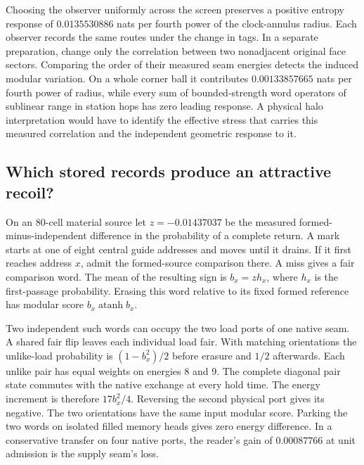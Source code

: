 \documentclass[11pt]{article}
\begin{document}
Choosing the observer uniformly across the screen preserves a positive
entropy response of $0.0135530886$ nats per fourth power of the
clock-annulus radius. Each observer records the same routes under
the change in tags. In a separate preparation, change only the
correlation between two nonadjacent original face sectors. Comparing
the order of their measured seam energies detects the induced modular
variation. On a whole corner ball it contributes $0.00133857665$ nats
per fourth power of radius, while every sum of bounded-strength word
operators of sublinear range in station hops has zero leading response.
A physical halo interpretation would have to identify the effective
stress that carries this measured correlation and the independent
geometric response to it.

\subsection{Which stored records produce an attractive recoil?}

On an 80-cell material source let $z=-0.01437037$ be the measured
formed-minus-independent difference in the probability of a complete
return. A mark starts at one of eight central guide addresses and moves
until it drains. If it first reaches address $x$, admit the formed-source
comparison there. A miss gives a fair comparison word. The mean of the
resulting sign is $b_x=z h_x$, where $h_x$ is the first-passage
probability. Erasing this word relative to its fixed formed reference
has modular score $b_x\operatorname{atanh} b_x$.

Two independent such words can occupy the two load ports of one
native seam. A shared fair flip leaves each individual load fair.
With matching orientations the unlike-load probability is
$(1-b_x^2)/2$ before erasure and $1/2$ afterwards. Each unlike pair
has equal weights on energies 8 and 9. The complete diagonal pair state
commutes with the native exchange at every hold time. The energy
increment is therefore $17b_x^2/4$. Reversing the second physical port
gives its negative. The two orientations have the same input modular
score. Parking the two words on isolated filled memory heads gives zero
energy difference. In a conservative transfer on four native ports,
the reader's gain of $0.00087766$ at unit admission is the supply
seam's loss.
\end{document}
